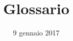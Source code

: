 


\author{\ALL}
\supervisor{\LS}
\dest{\ALL, \TV, \RC, \GP}
\title{Glossario}
\date{9 gennaio 2017}


\maketitle

\newpage

\begin{description}
	
\end{description}


